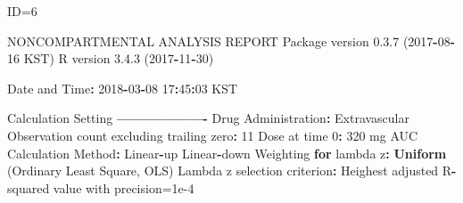 \documentclass[12pt,]{krantz}
\newenvironment{Shaded}{\begin{snugshade}}{\end{snugshade}}
\newcommand{\KeywordTok}[1]{\textcolor[rgb]{0.13,0.29,0.53}{\textbf{#1}}}
\newcommand{\DecValTok}[1]{\textcolor[rgb]{0.00,0.00,0.81}{#1}}
\newcommand{\FloatTok}[1]{\textcolor[rgb]{0.00,0.00,0.81}{#1}}
\newcommand{\StringTok}[1]{\textcolor[rgb]{0.31,0.60,0.02}{#1}}
\newcommand{\ControlFlowTok}[1]{\textcolor[rgb]{0.13,0.29,0.53}{\textbf{#1}}}
\newcommand{\OperatorTok}[1]{\textcolor[rgb]{0.81,0.36,0.00}{\textbf{#1}}}
\newcommand{\NormalTok}[1]{#1}
\theoremstyle{definition}
\theoremstyle{definition}
\theoremstyle{definition}
\theoremstyle{remark}
\begin{document}
\begin{Shaded}
\begin{Highlighting}[]
\NormalTok{ID=}\DecValTok{6}

\NormalTok{                        NONCOMPARTMENTAL ANALYSIS REPORT}
\NormalTok{                       Package version }\FloatTok{0.3}\NormalTok{.}\DecValTok{7}\NormalTok{ (}\DecValTok{2017}\OperatorTok{-}\DecValTok{08}\OperatorTok{-}\DecValTok{16}\NormalTok{ KST)}
\NormalTok{                          R version }\FloatTok{3.4}\NormalTok{.}\DecValTok{3}\NormalTok{ (}\DecValTok{2017}\OperatorTok{-}\DecValTok{11}\OperatorTok{-}\DecValTok{30}\NormalTok{)}

\NormalTok{Date and Time}\OperatorTok{:}\StringTok{ }\DecValTok{2018}\OperatorTok{-}\DecValTok{03}\OperatorTok{-}\DecValTok{08} \DecValTok{17}\OperatorTok{:}\DecValTok{45}\OperatorTok{:}\DecValTok{03}\NormalTok{ KST}

\NormalTok{Calculation Setting}
\OperatorTok{-------------------}
\NormalTok{Drug Administration}\OperatorTok{:}\StringTok{ }\NormalTok{Extravascular}
\NormalTok{Observation count excluding trailing zero}\OperatorTok{:}\StringTok{ }\DecValTok{11}
\NormalTok{Dose at time }\DecValTok{0}\OperatorTok{:}\StringTok{ }\DecValTok{320}\NormalTok{ mg}
\NormalTok{AUC Calculation Method}\OperatorTok{:}\StringTok{ }\NormalTok{Linear}\OperatorTok{-}\NormalTok{up Linear}\OperatorTok{-}\NormalTok{down}
\NormalTok{Weighting }\ControlFlowTok{for}\NormalTok{ lambda z}\OperatorTok{:}\StringTok{ }\KeywordTok{Uniform}\NormalTok{ (Ordinary Least Square, OLS)}
\NormalTok{Lambda z selection criterion}\OperatorTok{:}\StringTok{ }\NormalTok{Heighest adjusted R}\OperatorTok{-}\NormalTok{squared value with precision=}\FloatTok{1e-4}



\end{Highlighting}
\end{Shaded}
\end{document}
